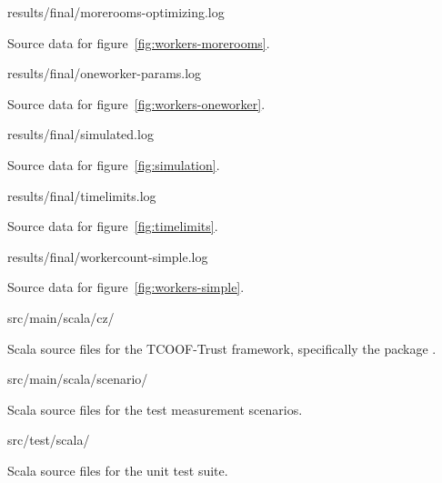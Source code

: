 \begin{filepath}
results/final/morerooms-optimizing.log
\end{filepath}
\begin{dsldesc}
    Source data for figure~\ref{fig:workers-morerooms}.
\end{dsldesc}

\begin{filepath}
results/final/oneworker-params.log
\end{filepath}
\begin{dsldesc}
    Source data for figure~\ref{fig:workers-oneworker}.
\end{dsldesc}

\begin{filepath}
results/final/simulated.log
\end{filepath}
\begin{dsldesc}
    Source data for figure~\ref{fig:simulation}.
\end{dsldesc}

\begin{filepath}
results/final/timelimits.log
\end{filepath}
\begin{dsldesc}
    Source data for figure~\ref{fig:timelimits}.
\end{dsldesc}

\begin{filepath}
results/final/workercount-simple.log
\end{filepath}
\begin{dsldesc}
    Source data for figure~\ref{fig:workers-simple}.
\end{dsldesc}

\begin{filepath}
src/main/scala/cz/
\end{filepath}
\begin{dsldesc}
    Scala source files for the TCOOF-Trust framework, specifically the package
    .
\end{dsldesc}

\begin{filepath}
src/main/scala/scenario/
\end{filepath}
\begin{dsldesc}
    Scala source files for the test measurement scenarios.
\end{dsldesc}

\begin{filepath}
src/test/scala/
\end{filepath}
\begin{dsldesc}
    Scala source files for the unit test suite.
\end{dsldesc}
